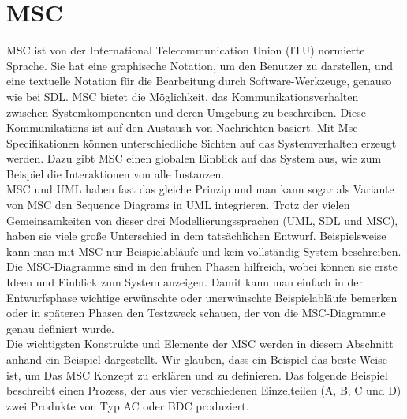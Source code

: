 
\section{MSC}
\label{sc:MSC}
MSC ist von der International Telecommunication Union (ITU) normierte Sprache.  Sie hat eine graphiseche Notation, um den Benutzer zu darstellen, und eine textuelle Notation für die Bearbeitung durch Software-Werkzeuge, genauso wie bei SDL.
MSC bietet die Möglichkeit, das Kommunikationsverhalten zwischen Systemkomponenten und deren Umgebung zu beschreiben. Diese Kommunikations ist auf den Austaush von Nachrichten basiert.
Mit Msc-Specifikationen können unterschiedliche Sichten auf das Systemverhalten erzeugt werden. 
Dazu gibt MSC einen globalen Einblick auf das System aus, wie zum Beispiel die Interaktionen von alle Instanzen.\\
MSC und UML haben fast das gleiche Prinzip und man kann sogar als Variante von MSC den Sequence Diagrams in UML integrieren.
Trotz der vielen Gemeinsamkeiten von dieser drei Modellierungssprachen (UML, SDL und MSC), haben sie viele große Unterschied in dem tatsächlichen Entwurf. Beispielsweise kann man mit MSC nur Beispielabläufe und kein vollständig System beschreiben.\\
Die MSC-Diagramme sind in den frühen Phasen hilfreich, wobei können sie erste Ideen und Einblick zum System anzeigen.
Damit kann man einfach in der Entwurfsphase wichtige erwünschte oder unerwünschte Beispielabläufe bemerken oder in späteren Phasen den Testzweck schauen, der von die MSC-Diagramme genau definiert wurde.\\

Die wichtigsten Konstrukte und Elemente der MSC werden in diesem Abschnitt anhand ein Beispiel dargestellt. Wir glauben, dass ein Beispiel das beste Weise ist, um Das MSC Konzept zu erklären und zu definieren. 
Das folgende Beispiel beschreibt einen Prozess, der aus vier verschiedenen Einzelteilen (A, B, C und D) zwei Produkte von Typ AC oder BDC produziert. 



